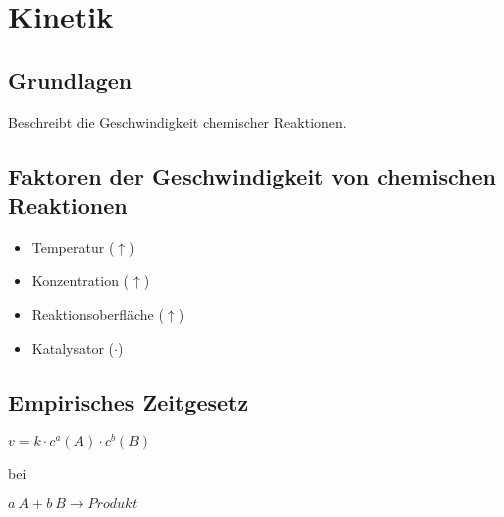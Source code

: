 \section{Kinetik}

\subsection{Grundlagen}

Beschreibt die Geschwindigkeit chemischer Reaktionen.

\subsection{Faktoren der Geschwindigkeit von chemischen Reaktionen}

\begin{itemize}
	\item Temperatur ($\uparrow$)
	\item Konzentration ($\uparrow$)
	\item Reaktionsoberfläche ($\uparrow$)
	\item Katalysator ($\cdot$)
\end{itemize}

\subsection{Empirisches Zeitgesetz}

{\large
	$v=k\cdot c^a(A)\cdot c^b(B)$	
}

bei

{\large
	$a \ A + b\  B \rightarrow Produkt$
}